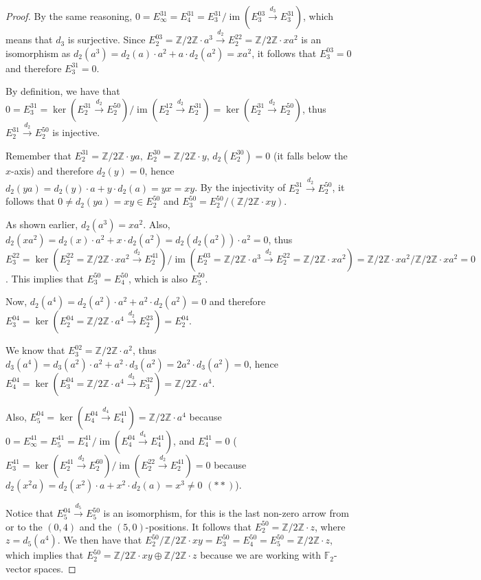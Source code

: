 \documentclass{article}
\newcommand{\numberset}{\mathbb}
\newcommand{\Z}{\numberset{Z}}
\newcommand{\F}{\numberset{F}}
\DeclareMathOperator{\im}{im}
\begin{document}
\begin{proof}
    By the same reasoning,
    $0=E^{31}_\infty=E^{31}_4=E^{31}_3/\im(E^{03}_3\xrightarrow{d_3}E^{31}_3)$,
    which means that $d_3$ is surjective. Since $E^{03}_2=\Z/2\Z\cdot
    a^3\xrightarrow{d_2} E^{22}_2=\Z/2\Z\cdot xa^2$ is an isomorphism as
    $d_2(a^3)=d_2(a)\cdot a^2+a\cdot d_2(a^2)=xa^2$, it follows that
    $E^{03}_3=0$ and therefore $E^{31}_3=0$.

    By definition, we have that
    $0=E^{31}_3=\ker(E^{31}_2\xrightarrow{d_2}E^{50}_2)/
    \im(E^{12}_2\xrightarrow{d_2}E^{31}_2)
    =\ker(E^{31}_2\xrightarrow{d_2}E^{50}_2)$, thus
    $E^{31}_2\xrightarrow{d_2}E^{50}_2$ is injective.
    
    Remember that $E^{31}_2=\Z/2\Z\cdot ya,\ E^{30}_2=\Z/2\Z\cdot y$,
    $d_2(E^{30}_2)=0$ (it falls below the $x$-axis) 
    and therefore $d_2(y)=0$, hence $d_2(ya)=d_2(y)\cdot a+y\cdot d_2(a)=yx=xy$.
    By the injectivity of $E^{31}_2\xrightarrow{d_2}E^{50}_2$, it follows that
    $0\neq d_2(ya)=xy\in E^{50}_2$ and $E^{50}_3=E^{50}_2/(\Z/2\Z\cdot xy)$.

    As shown earlier, $d_2(a^3)=xa^2$. Also, $d_2(xa^2)=d_2(x)\cdot a^2+x\cdot
    d_2(a^2)=d_2(d_2(a^2))\cdot a^2=0$, thus
    $E^{22}_3=\ker(E^{22}_2=\Z/2\Z\cdot xa^2\xrightarrow{d_2}E^{41}_2)/
    \im(E^{03}_2=\Z/2\Z\cdot a^3\xrightarrow{d_2}E^{22}_2=\Z/2\Z\cdot
    xa^2)=\Z/2\Z\cdot xa^2/\Z/2\Z\cdot xa^2=0$. This implies that
    $E^{50}_3=E^{50}_4$, which is also $E^{50}_5$.

    Now, $d_2(a^4)=d_2(a^2)\cdot a^2+a^2\cdot d_2(a^2)=0$ and therefore
    $E^{04}_3=\ker(E^{04}_2=\Z/2\Z\cdot a^4\xrightarrow{d_2}E^{23}_2)=E^{04}_2$.

    We know that $E^{02}_3=\Z/2\Z\cdot a^2$, thus $d_3(a^4)=d_3(a^2)\cdot
    a^2+a^2\cdot d_3(a^2)=2a^2\cdot d_3(a^2)=0$, hence
    $E^{04}_4=\ker(E^{04}_3=\Z/2\Z\cdot
    a^4\xrightarrow{d_3}E^{32}_3)=\Z/2\Z\cdot a^4$. 
    
    Also,
    $E^{04}_5=\ker(E^{04}_4\xrightarrow{d_4}E^{41}_4)=\Z/2\Z\cdot a^4$ because
    $0=E^{41}_\infty=E^{41}_5=E^{41}_4/\im(E^{04}_4\xrightarrow{d_4}E^{41}_4)$,
    and $E^{41}_4=0$ ($E^{41}_3=\ker(E^{41}_2\xrightarrow{d_2}E^{60}_2)/
    \im(E^{22}_2\xrightarrow{d_2}E^{41}_2)=0$ because $d_2(x^2a)=d_2(x^2)\cdot
    a+x^2\cdot d_2(a)=x^3\neq 0$ $(**)$).
    
    Notice that $E^{04}_5\xrightarrow{d_5}E^{50}_5$ is an isomorphism, for this
    is the last non-zero arrow from or to the $(0,4)$ and the $(5,0)$-positions.
    It follows that $E^{50}_2=\Z/2\Z\cdot z$, where $z=d_5(a^4)$. We then have
    that $E^{50}_2/\Z/2\Z\cdot xy=E^{50}_3=E^{50}_4=E^{50}_5=\Z/2\Z\cdot z$,
    which implies that $E^{50}_2=\Z/2\Z\cdot xy\oplus\Z/2\Z\cdot z$ because we
    are working with $\F_2$-vector spaces.


\end{proof}
\end{document}
